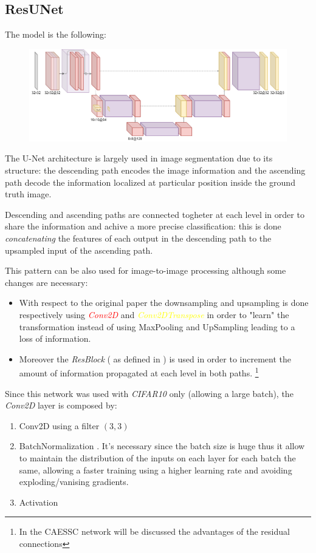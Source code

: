 \subsection{ResUNet}
The model is the following:
\begin{figure}[H]
    \centering
    \includegraphics[scale=0.3]{subsections/resunet/resunet.png}
\end{figure}


The U-Net \cite{unet} architecture is largely used in image segmentation due to its structure: the descending path encodes the image information and the ascending path decode the information localized at particular position inside the ground truth image.

Descending and ascending paths are connected togheter at each level in order to share the information and achive a more precise classification: this is done \textit{concatenating} the features of each output in the descending path to the upsampled input of the ascending path.  

This pattern can be also used for image-to-image processing although some changes are necessary:
\begin{itemize}
    \item With respect to the original paper the downsampling and upsampling is done respectively using \textcolor{red}{\textit{Conv2D}} and \textcolor{yellow}{\textit{Conv2DTranspose}} in order to "learn" the transformation instead of using MaxPooling and UpSampling leading to a loss of information.
    \item Moreover the \textit{ResBlock} ( as defined in \cite{resnet} ) is used in order to increment the amount of information propagated at each level in both paths. \footnote{In the CAESSC network will be discussed the advantages of the residual connections}
\end{itemize}

Since this network was used with \textit{CIFAR10} only (allowing a large batch), the \textit{Conv2D} layer is composed by:
\begin{enumerate}
    \item Conv2D using a filter $(3,3)$
    \item BatchNormalization \cite{BN}. It's necessary since the batch size is huge thus it allow to maintain the distribution of the inputs on each layer for each batch the same, allowing a faster training using a higher learning rate and avoiding exploding/vanising gradients.
    \item Activation
\end{enumerate}

